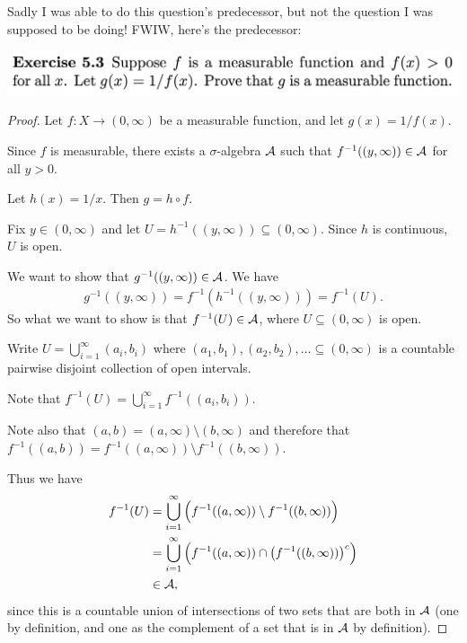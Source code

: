 Sadly I was able to do this question's predecessor, but not the question I was supposed to be doing! FWIW,
here's the predecessor:

\begin{mdframed}
  \includegraphics[width=400pt]{img/analysis--berkeley-202a-hw06-b799.png}
\end{mdframed}

\begin{proof}
  Let $f: X \to (0, \infty)$ be a measurable function, and let $g(x) = 1/f(x)$.

  Since $f$ is measurable, there exists a $\sigma$-algebra $\mathcal A$ such that $f^{-1}((y, \infty)) \in \mathcal A$
  for all $y > 0$.

  Let $h(x) = 1/x$. Then $g = h \circ f$.

  Fix $y \in (0, \infty)$ and let $U = h^{-1}((y, \infty)) \subseteq (0, \infty)$. Since $h$ is
  continuous, $U$ is open.

  We want to show that $g^{-1}((y, \infty)) \in \mathcal A$. We have
  \begin{align*}
    g^{-1}((y, \infty)) = f^{-1}(h^{-1}((y, \infty))) = f^{-1}(U).
  \end{align*}
  So what we want to show is that $f^{-1}(U) \in \mathcal A$, where $U \subseteq (0, \infty)$ is open.

  Write $U = \bigcup_{i=1}^\infty (a_i, b_i)$ where $(a_1, b_1), (a_2, b_2), \ldots \subseteq (0, \infty)$ is a
  countable pairwise disjoint collection of open intervals.

  Note that $f^{-1}(U) = \bigcup_{i=1}^\infty f^{-1}((a_i, b_i))$.

  Note also that $(a, b) = (a, \infty) \setminus (b, \infty)$ and therefore
  that $f^{-1}((a, b)) = f^{-1}((a, \infty)) \setminus f^{-1}((b, \infty))$.

  Thus we have
  \begin{align*}
    f^{-1}(U)
    &= \bigcup_{i=1}^\infty \Big(f^{-1}((a, \infty)) \setminus f^{-1}((b, \infty))\Big) \\
    &= \bigcup_{i=1}^\infty \Big(f^{-1}((a, \infty)) \cap \big(f^{-1}((b, \infty))\big)^c\Big) \\
    &\in \mathcal A,
  \end{align*}
  since this is a countable union of intersections of two sets that are both in $\mathcal A$ (one by definition, and
  one as the complement of a set that is in $\mathcal A$ by definition).
\end{proof}



